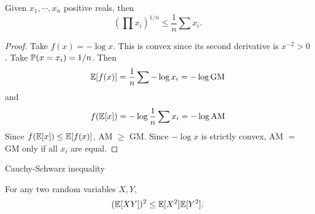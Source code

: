 %
\begin{note}
  \begin{field}
    \begin{cor}[AM-GM inequality]
      Given $x_1, \cdots, x_n$ positive reals, then
      \[
        \left(\prod x_i\right)^{1/n} \leq \frac{1}{n}\sum x_i.
      \]
    \end{cor}
  \end{field}
  \begin{field}
    \begin{proof}
      Take $f(x) = -\log x$. This is convex since its second derivative is $x^{-2} > 0$.
      Take $\P(x = x_i) = 1/n$. Then
      \[
        \E[f(x)] = \frac{1}{n}\sum -\log x_i = -\log \text{GM}
      \]
      and
      \[
        f(\E[x]) = -\log \frac{1}{n}\sum x_i = -\log\text{AM}
      \]
      Since $f(\E[x]) \leq \E[f(x)]$, AM $\geq$ GM. Since $-\log x$ is strictly convex, AM $=$ GM only if all $x_i$ are equal.
    \end{proof}
  \end{field}
  \xplain{}%
\end{note}

%
\begin{note}
  \begin{field}
    Cauchy-Schwarz inequality
  \end{field}
  \begin{field}
    \begin{thm}
      For any two random variables $X, Y$,
      \[
        (\E[XY])^2 \leq \E[X^2]\E[Y^2].
      \]
    \end{thm}
  \end{field}
  \xplain{}%
\end{note}

